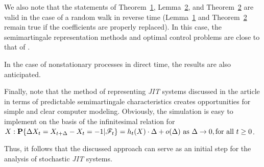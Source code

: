 We also note that the statements of Theorem~\hyperlink{b:Th1}{1}, Lemma~\hyperlink{b:l2}{2}, and Theorem~\hyperlink{b:Th2}{2} are valid in the case of a random walk in reverse time (Lemma~\hyperlink{b:l1}{1}  and Theorem~\hyperlink{b:Th2}{2}  remain true if the coefficients are properly replaced). In this case, the semimartingale representation methods and optimal control problems are close to that of \cite{butov2015}. 

In the case of nonstationary processes in direct time, the results are also anticipated. 

Finally, note that the method of representing  \emph{JIT} systems discussed in the article in terms of predictable semimartingale characteristics creates opportunities for simple and clear computer modeling. Obviously, the simulation is easy to implement on the basis of the infinitesimal relation for $X: \textbf P\{{\Delta}X_t =X_{t+\Delta}-X_t = -1|{\mathscr{F}}_t \}=h_t (X)\cdot \Delta+o(\Delta)\text{ as } \Delta \to 0, \text{for all $t \geq 0$}$.



	Thus, it follows that the discussed approach can serve as an initial step for the analysis of stochastic  \emph{JIT} systems.

	

\smallskip











